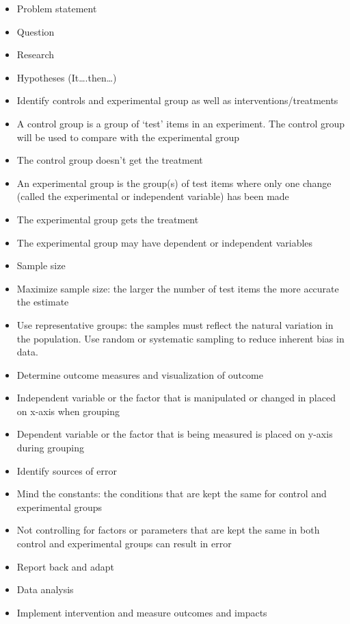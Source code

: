 \documentclass[]{book}
\providecommand{\tightlist}{%
  \setlength{\itemsep}{0pt}\setlength{\parskip}{0pt}}
\begin{document}
\begin{itemize}
\tightlist
\item
  Problem statement
\item
  Question
\item
  Research
\item
  Hypotheses (It\ldots{}.then\ldots{})
\item
  Identify controls and experimental group as well as interventions/treatments
\item
  A control group is a group of `test' items in an experiment. The control group will be used to compare with the experimental group
\item
  The control group doesn't get the treatment
\item
  An experimental group is the group(s) of test items where only one change (called the experimental or independent variable) has been made
\item
  The experimental group gets the treatment
\item
  The experimental group may have dependent or independent variables
\item
  Sample size
\item
  Maximize sample size: the larger the number of test items the more accurate the estimate
\item
  Use representative groups: the samples must reflect the natural variation in the population. Use random or systematic sampling to reduce inherent bias in data.
\item
  Determine outcome measures and visualization of outcome
\item
  Independent variable or the factor that is manipulated or changed in placed on x-axis when grouping
\item
  Dependent variable or the factor that is being measured is placed on y-axis during grouping
\item
  Identify sources of error
\item
  Mind the constants: the conditions that are kept the same for control and experimental groups
\item
  Not controlling for factors or parameters that are kept the same in both control and experimental groups can result in error
\item
  Report back and adapt
\item
  Data analysis
\item
  Implement intervention and measure outcomes and impacts
\end{itemize}
\end{document}
